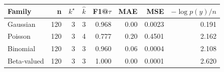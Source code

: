 \begin{tabular}{lrrrrrrr}\toprule
Family & n & $k^\star$ & $\hat{k}$ & F1@$\tau$ & MAE & MSE & $-\log p(y)/n$\\\midrule
Gaussian & 120 & 3 & 3 & 0.968 & 0.00 & 0.0023 & 0.191\\
Poisson & 120 & 3 & 4 & 0.777 & 0.20 & 0.4501 & 2.162\\
Binomial & 120 & 3 & 3 & 0.960 & 0.06 & 0.0004 & 2.108\\
Beta-valued & 120 & 3 & 3 & 1.000 & 0.00 & 0.0001 & 2.620\\
\bottomrule\end{tabular}
